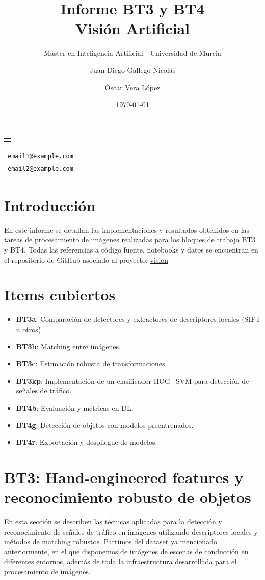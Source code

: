 \documentclass[11pt,a4paper]{article}
\subtitle{Máster en Inteligencia Artificial - Universidad de Murcia}
\makeatletter
\providecommand\@subtitle{}
\providecommand\@emailone{email1@example.com}
\providecommand\@emailtwo{email2@example.com}
\renewcommand{\maketitle}{%
    \begin{titlepage}
        \centering
        \thispagestyle{empty}
        \vspace*{2.5cm}
        {\Huge\bfseries\@title\par}
        \vspace{1cm}
        {\Large\itshape\@subtitle\par}
        \vspace{3cm}
        {\large
            \begin{tabular}{c}
                \@author
            \end{tabular}\par
        }
        \vspace{0.6cm}
        {\small
            \begin{tabular}{c}
                \texttt{\@emailone} \\[0.8ex]
                \texttt{\@emailtwo}
            \end{tabular}\par
        }
        \vfill
        {\large \@date\par}
    \end{titlepage}%
}
\makeatother
\begin{document}
\title{Informe BT3 y BT4\\[1ex]\large Visión Artificial}
\author{Juan Diego Gallego Nicolás \and Óscar Vera López}
\date{\today}

\maketitle

\renewcommand{\contentsname}{Índice}
\setcounter{tocdepth}{3}
\tableofcontents
\clearpage


\section*{Introducción}
En este informe se detallan las implementaciones y resultados obtenidos en las tareas de procesamiento de imágenes realizadas para los bloques de trabajo BT3 y BT4.
Todas las referencias a código fuente, notebooks y datos se encuentran en el repositorio de GitHub asociado al proyecto: \href{https://github.com/oscarveral/vision}{vision}

\section*{Items cubiertos}
\begin{itemize}
  \item \textbf{BT3a}: Comparación de detectores y extractores de descriptores locales (SIFT u otros).
  \item \textbf{BT3b}: Matching entre imágenes.
  \item \textbf{BT3c}: Estimación robusta de transformaciones.
  \item \textbf{BT3kp}: Implementación de un clasificador HOG+SVM para detección de señales de tráfico.
  \item \textbf{BT4b}: Evaluación y métricas en DL.
  \item \textbf{BT4g}: Detección de objetos con modelos preentrenados.
  \item \textbf{BT4r}: Exportación y despliegue de modelos.
\end{itemize}

\clearpage

\section{BT3: Hand-engineered features y reconocimiento robusto de objetos}

En esta sección se describen las técnicas aplicadas para la detección y reconocimiento de señales de tráfico en imágenes utilizando descriptores locales y 
métodos de matching robustos. Partimos del dataset ya mencionado anteriormente, en el que disponemos de 
imágenes de escenas de conducción en diferentes entornos, además de toda la infraestructura desarrollada
para el procesamiento de imágenes.
\end{document}
